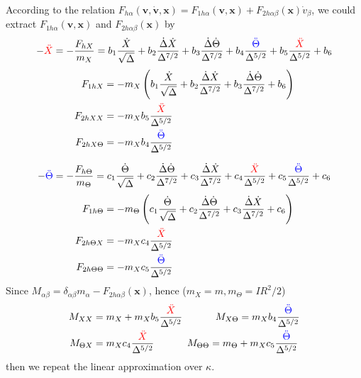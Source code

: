 \documentclass[books,12pt]{elegantpaper}
\newcommand{\bbf}[1]{\mathbf{#1}}
\newcommand{\tens}{\ \ \ \ \ \ \ \ \ \ }
\newcommand{\beq}{\begin{equation}}
\newcommand{\eeq}{\end{equation}}
\newcommand{\bgn}{\begin{align}}
\begin{document}
According to the relation $F_{h\alpha}(\bbf{v},\dot{\bbf{v}},\bbf{x}) = F_{1h\alpha}(\bbf{v},\bbf{x}) + F_{2h\alpha\beta}(\bbf{x}) \dot{v}_\beta $, we could extract $F_{1h\alpha}(\bbf{v},\bbf{x})$ and $F_{2h\alpha\beta}(\bbf{x})$ by 
\beq - \textcolor{red}{\ddot{X}} = - \frac{F_{hX}}{m_X} = b_1 \frac{\dot{X}}{\sqrt\Delta} + b_2  \frac{\dot\Delta \dot{X}}{\Delta^{7/2}} + b_3 \frac{\dot\Delta \dot\Theta}{\Delta^{7/2}} + b_4 \frac{\textcolor{blue}{\ddot{\Theta}}}{\Delta^{5/2}} + b_5 \frac{\textcolor{red}{\ddot{X}}}{\Delta^{5/2}} + b_6 \eeq
\beq \bgn
F_{1hX} &= -m_X \left( b_1 \frac{\dot{X}}{\sqrt\Delta} + b_2  \frac{\dot\Delta \dot{X}}{\Delta^{7/2}} + b_3 \frac{\dot\Delta \dot\Theta}{\Delta^{7/2}} + b_6 \right) \\
F_{2hXX} &= -m_X b_5 \frac{\textcolor{red}{\ddot{X}}}{\Delta^{5/2}} \\
F_{2hX\Theta} &= -m_X b_4 \frac{\textcolor{blue}{\ddot{\Theta}}}{\Delta^{5/2}}
\end{align} \eeq


\beq - \textcolor{blue}{\ddot{\Theta}} = - \frac{F_{h\Theta}}{m_\Theta} = c_1 \frac{\dot\Theta}{\sqrt\Delta} + c_2 \frac{\dot\Delta \dot\Theta}{\Delta^{7/2}} + c_3 \frac{\dot\Delta \dot{X}}{\Delta^{7/2}} + c_4 \frac{\textcolor{red}{\ddot{X}}}{\Delta^{5/2}} + c_5 \frac{\textcolor{blue}{\ddot{\Theta}}}{\Delta^{5/2}} + c_6 \eeq
\beq \bgn
F_{1h\Theta} &= -m_\Theta \left( c_1 \frac{\dot\Theta}{\sqrt\Delta} + c_2 \frac{\dot\Delta \dot\Theta}{\Delta^{7/2}} + c_3 \frac{\dot\Delta \dot{X}}{\Delta^{7/2}} + c_6 \right) \\
F_{2h\Theta X} &= -m_X c_4 \frac{\textcolor{red}{\ddot{X}}}{\Delta^{5/2}} \\
F_{2h\Theta\Theta} &= -m_X c_5 \frac{\textcolor{blue}{\ddot{\Theta}}}{\Delta^{5/2}}
\end{align} \eeq
Since $M_{\alpha\beta} = \delta_{\alpha\beta} m_\alpha - F_{2h\alpha\beta}(\bbf{x})$, hence ($m_X = m, m_\Theta = IR^2/2$) 
\beq \bgn
M_{XX} &= m_X + m_X b_5 \frac{\textcolor{red}{\ddot{X}}}{\Delta^{5/2}} \tens M_{X\Theta} = m_X b_4 \frac{\textcolor{blue}{\ddot{\Theta}}}{\Delta^{5/2}} \\
M_{\Theta X} &= m_X c_4 \frac{\textcolor{red}{\ddot{X}}}{\Delta^{5/2}} \tens M_{\Theta \Theta} = m_\Theta + m_X c_5 \frac{\textcolor{blue}{\ddot{\Theta}}}{\Delta^{5/2}}
\end{align} \eeq
then we repeat the linear approximation over $\kappa$.


\nocite{EINAV2010,Havrylchyk2018} 



\end{document}
